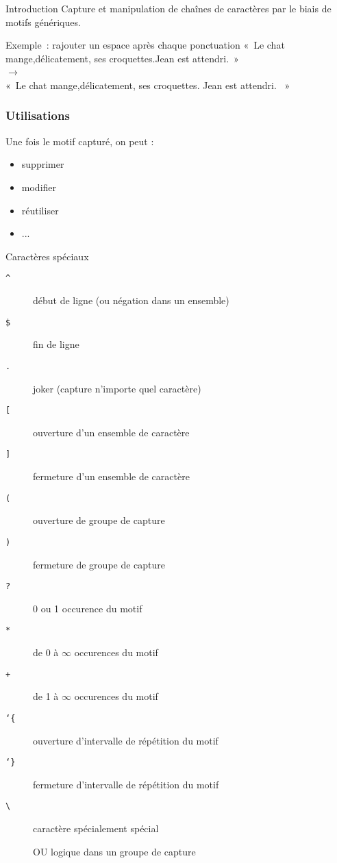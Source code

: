 \begin{frame}{Introduction}
  Capture et manipulation de chaînes de caractères par le biais de motifs génériques.

  \begin{exampleblock}{Exemple~: rajouter un espace après chaque ponctuation}
    «~Le chat mange,délicatement, ses croquettes.Jean est attendri.~» \\
    $\rightarrow$ \\
    «~Le chat mange,délicatement, ses croquettes. Jean est attendri. ~» \\
  \end{exampleblock}
\end{frame}

\begin{frame}
  \frametitle{Utilisations}
  Une fois le motif capturé, on peut :
  \begin{itemize}
  \item supprimer
  \item modifier
  \item réutiliser
  \item ...
  \end{itemize}
\end{frame}

\begin{frame}{Caractères spéciaux}
  \begin{description}
  \item[\texttt{\^{}}] début de ligne (ou négation dans un ensemble)
  \item[\texttt{\$}] fin de ligne
  \item[\texttt{.}] joker (capture n'importe quel caractère) 
  \item[\texttt{[}] ouverture d'un ensemble de caractère
  \item[\texttt{]}] fermeture d'un ensemble de caractère
  \item[\texttt{(}] ouverture de groupe de capture
  \item[\texttt{)}] fermeture de groupe de capture
  \item[\texttt{?}] 0 ou 1 occurence du motif
  \item[\texttt{*}] de 0 à $\infty$ occurences du motif
  \item[\texttt{+}] de 1 à $\infty$ occurences du motif
  \item[\texttt{\char`\{}] ouverture d'intervalle de répétition du motif
  \item[\texttt{\char`\}}] fermeture d'intervalle de répétition du motif
  \item[\texttt{\textbackslash}] caractère spécialement spécial
  \item[\texttt{\textbar}] OU logique dans un groupe de capture
  \end{description}
\end{frame}

